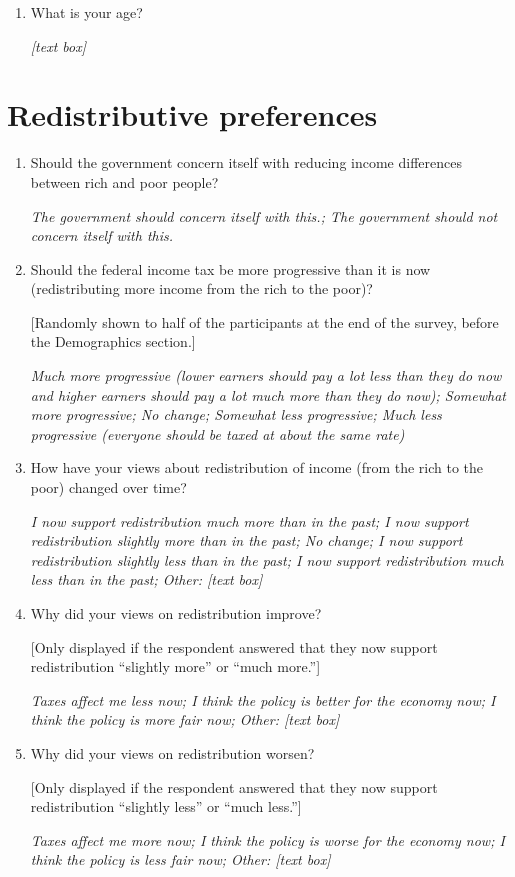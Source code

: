 \documentclass[11pt, headsepline]{article}
\begin{document}
\begin{enumerate}[resume]

    \item What is your age?

    \textit{[text box]}

\end{enumerate}

\section*{Redistributive preferences}

\begin{enumerate}[resume]
    
    \item Should the government concern itself with reducing income differences between rich and poor people?

    \textit{The government should concern itself with this.; The government should not concern itself with this.}
    
    \item Should the federal income tax be more progressive than it is now (redistributing more income from the rich to the poor)?

    [Randomly shown to half of the participants at the end of the survey, before the Demographics section.]

    \textit{Much more progressive (lower earners should pay a lot less than they do now and higher earners should pay a lot much more than they do now); Somewhat more progressive; No change; Somewhat less progressive; Much less progressive (everyone should be taxed at about the same rate)}

    \item How have your views about redistribution of income (from the rich to the poor) changed over time? 

    \textit{I now support redistribution much more than in the past; I now support redistribution slightly more than in the past; No change; I now support redistribution slightly less than in the past; I now support redistribution much less than in the past; Other: [text box]}

    \item Why did your views on redistribution improve? 
    
    [Only displayed if the respondent answered that they now support redistribution ``slightly more'' or ``much more.'']

    \textit{Taxes affect me less now; I think the policy is better for the economy now; I think the policy is more fair now; Other: [text box]}

    \item Why did your views on redistribution worsen? 
    
    [Only displayed if the respondent answered that they now support redistribution ``slightly less'' or ``much less.'']

    \textit{Taxes affect me more now; I think the policy is worse for the economy now; I think the policy is less fair now; Other: [text box]}
    
\end{enumerate}
\end{document}
